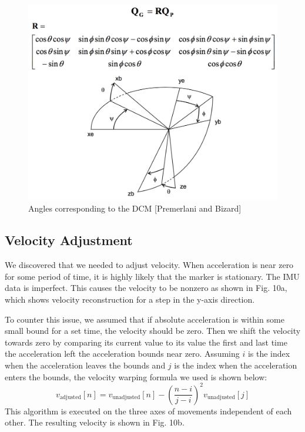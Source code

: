 \documentclass[10pt,journal]{IEEEtran}
\begin{document}
\begin{figure}[h]
  \centering
    \includegraphics[width=\linewidth]{figures/dcm}
  \caption{Angles corresponding to the DCM [Premerlani and Bizard]}
  \label{fig:vel-adjust}
\end{figure}

\subsection{Velocity Adjustment}
	We discovered that we needed to adjust velocity. When acceleration is near zero for some period of time, it is highly likely that the marker is stationary. The IMU data is imperfect. This causes the velocity to be nonzero as shown in Fig. 10a, which shows velocity reconstruction for a step in the y-axis direction.
\par To counter this issue, we assumed that if absolute acceleration is within some small bound for a set time, the velocity should be zero. Then we shift the velocity towards zero by comparing its current value to its value the first and last time the acceleration left the acceleration bounds near zero. Assuming $i$ is the index when the acceleration leaves the bounds and $j$ is the index when the acceleration enters the bounds, the velocity warping formula we used is shown below:
$$v_{\text{adjusted}}[n] = v_{\text{unadjusted}}[n] - \left(\frac{n-i}{j-i}\right)^2 v_{\text{unadjusted}}[j]$$
This algorithm is executed on the three axes of movements independent of each other. The resulting velocity is shown in Fig. 10b.
\end{document}
